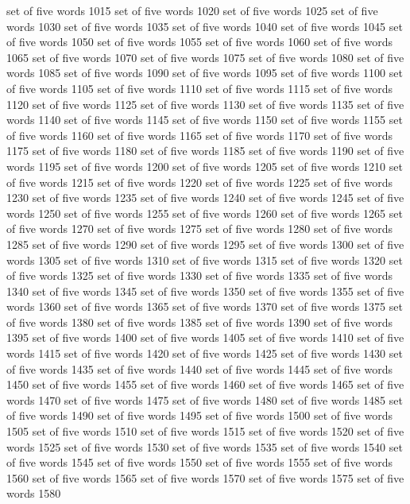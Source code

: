 set	of	five	words	1015
set	of	five	words	1020
set	of	five	words	1025
set	of	five	words	1030
set	of	five	words	1035
set	of	five	words	1040
set	of	five	words	1045
set	of	five	words	1050
set	of	five	words	1055
set	of	five	words	1060
set	of	five	words	1065
set	of	five	words	1070
set	of	five	words	1075
set	of	five	words	1080
set	of	five	words	1085
set	of	five	words	1090
set	of	five	words	1095
set	of	five	words	1100
set	of	five	words	1105
set	of	five	words	1110
set	of	five	words	1115
set	of	five	words	1120
set	of	five	words	1125
set	of	five	words	1130
set	of	five	words	1135
set	of	five	words	1140
set	of	five	words	1145
set	of	five	words	1150
set	of	five	words	1155
set	of	five	words	1160
set	of	five	words	1165
set	of	five	words	1170
set	of	five	words	1175
set	of	five	words	1180
set	of	five	words	1185
set	of	five	words	1190
set	of	five	words	1195
set	of	five	words	1200
set	of	five	words	1205
set	of	five	words	1210
set	of	five	words	1215
set	of	five	words	1220
set	of	five	words	1225
set	of	five	words	1230
set	of	five	words	1235
set	of	five	words	1240
set	of	five	words	1245
set	of	five	words	1250
set	of	five	words	1255
set	of	five	words	1260
set	of	five	words	1265
set	of	five	words	1270
set	of	five	words	1275
set	of	five	words	1280
set	of	five	words	1285
set	of	five	words	1290
set	of	five	words	1295
set	of	five	words	1300
set	of	five	words	1305
set	of	five	words	1310
set	of	five	words	1315
set	of	five	words	1320
set	of	five	words	1325
set	of	five	words	1330
set	of	five	words	1335
set	of	five	words	1340
set	of	five	words	1345
set	of	five	words	1350
set	of	five	words	1355
set	of	five	words	1360
set	of	five	words	1365
set	of	five	words	1370
set	of	five	words	1375
set	of	five	words	1380
set	of	five	words	1385
set	of	five	words	1390
set	of	five	words	1395
set	of	five	words	1400
set	of	five	words	1405
set	of	five	words	1410
set	of	five	words	1415
set	of	five	words	1420
set	of	five	words	1425
set	of	five	words	1430
set	of	five	words	1435
set	of	five	words	1440
set	of	five	words	1445
set	of	five	words	1450
set	of	five	words	1455
set	of	five	words	1460
set	of	five	words	1465
set	of	five	words	1470
set	of	five	words	1475
set	of	five	words	1480
set	of	five	words	1485
set	of	five	words	1490
set	of	five	words	1495
set	of	five	words	1500
set	of	five	words	1505
set	of	five	words	1510
set	of	five	words	1515
set	of	five	words	1520
set	of	five	words	1525
set	of	five	words	1530
set	of	five	words	1535
set	of	five	words	1540
set	of	five	words	1545
set	of	five	words	1550
set	of	five	words	1555
set	of	five	words	1560
set	of	five	words	1565
set	of	five	words	1570
set	of	five	words	1575
set	of	five	words	1580
